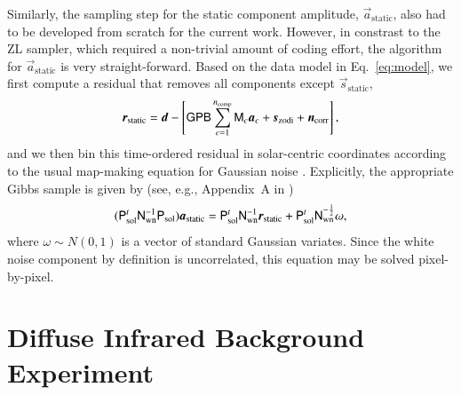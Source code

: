 \documentclass{aa}
\newcommand{\dv}[0]{\vec{d}}
\newcommand{\B}[0]{\tens{B}}
\newcommand{\G}[0]{\tens{G}}
\newcommand{\n}[0]{\vec{n}}
\newcommand{\s}[0]{\vec{s}}
\renewcommand{\a}[0]{\vec{a}}
\newcommand{\N}[0]{\tens{N}}
\newcommand{\M}[0]{\tens{M}}
\renewcommand{\r}[0]{\vec{r}}
\renewcommand{\P}[0]{\tens{P}}
\begin{document}
Similarly, the sampling step for the static component amplitude,
$\a_{\mathrm{static}}$, also had to be developed from scratch for the
current work. However, in constrast to the ZL sampler, which required
a non-trivial amount of coding effort, the algorithm for
$\a_{\mathrm{static}}$ is very straight-forward. Based on the data
model in Eq.~\eqref{eq:model}, we first compute a residual that
removes all components except $\s_{\mathrm{static}}$,
\begin{equation}
  \r_{\mathrm{static}} = \dv - \left[\G\P\B\sum_{c=1}^{n_{\mathrm{comp}}}\M_c\a_c+\s_{\mathrm{zodi}} 
    + \n_\mathrm{corr}\right],
\end{equation}
and we then bin this time-ordered residual in solar-centric coordinates
according to the usual map-making equation for Gaussian noise
\citep[e.g.,][]{tegmark_mapmaking}. Explicitly, the appropriate
Gibbs sample is given by (see, e.g., Appendix~A in \citealp{bp01})
\begin{equation}
(\P_{\mathrm{sol}}^t\N_{\mathrm{wn}}^{-1}\P_{\mathrm{sol}})\a_{\mathrm{static}} 
  = \P_{\mathrm{sol}}^t\N_{\mathrm{wn}}^{-1}\r_{\mathrm{static}} + \P_{\mathrm{sol}}^t\N_{\mathrm{wn}}^{-\frac{1}{2}}\omega,
\end{equation}
where $\omega\sim N(0,1)$ is a vector of standard Gaussian
variates. Since the white noise component by definition is
uncorrelated, this equation may be solved pixel-by-pixel.



\section{Diffuse Infrared Background Experiment}
\label{sec:dirbe}
\end{document}
